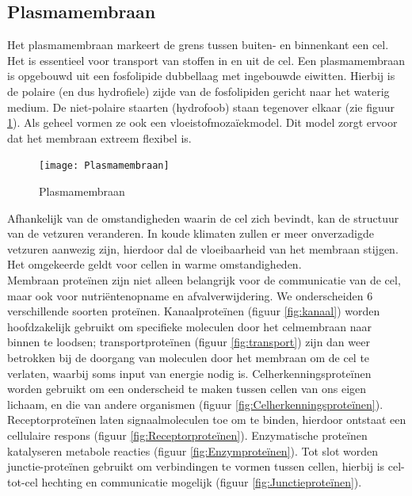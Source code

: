 \documentclass[a4paper,kul]{kulakarticle} %
\begin{document}
\subsection{Plasmamembraan}
Het plasmamembraan markeert de grens tussen buiten- en binnenkant een cel. Het is essentieel voor transport van stoffen in en uit de cel. Een plasmamembraan is opgebouwd uit een fosfolipide dubbellaag met ingebouwde eiwitten. Hierbij is de polaire (en dus hydrofiele) zijde van de fosfolipiden gericht naar het waterig medium. De niet-polaire staarten (hydrofoob) staan tegenover elkaar (zie figuur \ref{fig:plasmamembraan}). Als geheel vormen ze ook een vloeistofmozaïekmodel. Dit model zorgt ervoor dat het membraan extreem flexibel is. 
\begin{figure}[h]
	\centering
	\texttt{[image: Plasmamembraan]}
	\caption[Plasmamembraan]{Plasmamembraan}
	\label{fig:plasmamembraan}
\end{figure}
\noindent
Afhankelijk van de omstandigheden waarin de cel zich bevindt, kan de structuur van de vetzuren veranderen. In koude klimaten zullen er meer onverzadigde vetzuren aanwezig zijn, hierdoor dal de vloeibaarheid van het membraan stijgen. Het omgekeerde geldt voor cellen in warme omstandigheden. 
\\
Membraan proteïnen zijn niet alleen belangrijk voor de communicatie van de cel, maar ook voor nutriëntenopname en afvalverwijdering. We onderscheiden 6 verschillende soorten proteïnen. Kanaalproteïnen (figuur \ref{fig:kanaal}) worden hoofdzakelijk gebruikt om specifieke moleculen door het celmembraan naar binnen te loodsen; transportproteïnen (figuur \ref{fig:transport}) zijn dan weer betrokken bij de doorgang van moleculen door het membraan om de cel te verlaten, waarbij soms input van energie nodig is. Celherkenningsproteïnen worden gebruikt om een onderscheid te maken tussen cellen van ons eigen lichaam, en die van andere organismen (figuur \ref{fig:Celherkenningsproteïnen}). Receptorproteïnen laten signaalmoleculen toe om te binden, hierdoor ontstaat een cellulaire respons (figuur \ref{fig:Receptorproteïnen}). Enzymatische proteïnen katalyseren metabole reacties (figuur \ref{fig:Enzymproteïnen}). Tot slot worden junctie-proteïnen gebruikt om verbindingen te vormen tussen cellen, hierbij is cel-tot-cel hechting en communicatie mogelijk (figuur \ref{fig:Junctieproteïnen}).
\end{document}
